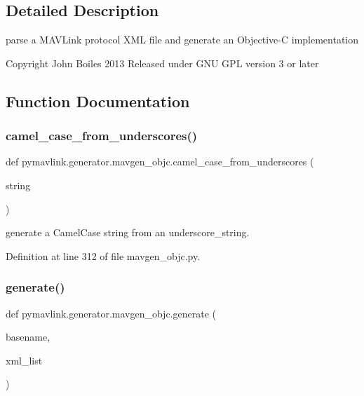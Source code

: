 \subsection{Detailed Description}
\begin{DoxyVerb}parse a MAVLink protocol XML file and generate an Objective-C implementation

Copyright John Boiles 2013
Released under GNU GPL version 3 or later
\end{DoxyVerb}
 

\subsection{Function Documentation}
\mbox{\label{namespacepymavlink_1_1generator_1_1mavgen__objc_aadc6040b4b644298ef796c16cdabb42c}} 
\subsubsection{\texorpdfstring{camel\_case\_from\_underscores()}{camel\_case\_from\_underscores()}}
{\footnotesize\ttfamily def pymavlink.\+generator.\+mavgen\+\_\+objc.\+camel\+\_\+case\+\_\+from\+\_\+underscores (\begin{DoxyParamCaption}\item[{}]{string }\end{DoxyParamCaption})}

\begin{DoxyVerb}generate a CamelCase string from an underscore_string.\end{DoxyVerb}
 

Definition at line 312 of file mavgen\+\_\+objc.\+py.

\mbox{\label{namespacepymavlink_1_1generator_1_1mavgen__objc_a2a6922cc4a5527ce0746314515c76438}} 
\subsubsection{\texorpdfstring{generate()}{generate()}}
{\footnotesize\ttfamily def pymavlink.\+generator.\+mavgen\+\_\+objc.\+generate (\begin{DoxyParamCaption}\item[{}]{basename,  }\item[{}]{xml\+\_\+list }\end{DoxyParamCaption})}

